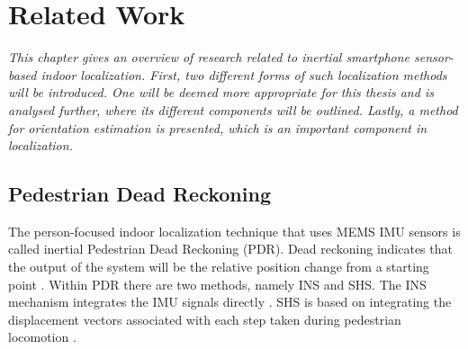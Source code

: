 

\chapter{Related Work}
\label{chap:related work}
\textit{This chapter gives an overview of research related to inertial smartphone sensor-based indoor localization. First, two different forms of such localization methods will be introduced. One will be deemed more appropriate for this thesis and is analysed further, where its different components will be outlined. Lastly, a method for orientation estimation is presented, which is an important component in localization. }


\section{Pedestrian Dead Reckoning}
\label{sec:relevant_research}
The person-focused indoor localization technique that uses \ac{MEMS} \ac{IMU} sensors is called inertial Pedestrian Dead Reckoning (PDR). Dead reckoning indicates that the output of the system will be the relative position change from a starting point \cite{Yu2018}. Within PDR there are two methods, namely \ac{INS} and \ac{SHS}. The INS mechanism integrates the \ac{IMU} signals directly \cite{Diez2018b}. \ac{SHS} is based on integrating the displacement vectors associated with each step taken during pedestrian locomotion \cite{Davidson2017}.  \par

